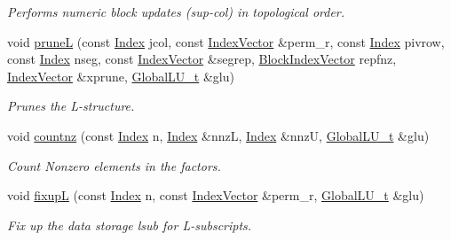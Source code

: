 \begin{DoxyCompactItemize}
\begin{DoxyCompactList}\small\item\em Performs numeric block updates (sup-\/col) in topological order. \end{DoxyCompactList}\item 
void \hyperlink{group___sparse_l_u___module_a350464d1c83182fbd7da8a5a74bdfde8}{pruneL} (const \hyperlink{namespace_eigen_a62e77e0933482dafde8fe197d9a2cfde}{Index} jcol, const \hyperlink{group___core___module}{Index\+Vector} \&perm\+\_\+r, const \hyperlink{namespace_eigen_a62e77e0933482dafde8fe197d9a2cfde}{Index} pivrow, const \hyperlink{namespace_eigen_a62e77e0933482dafde8fe197d9a2cfde}{Index} nseg, const \hyperlink{group___core___module}{Index\+Vector} \&segrep, \hyperlink{group___core___module_class_eigen_1_1_ref}{Block\+Index\+Vector} repfnz, \hyperlink{group___core___module}{Index\+Vector} \&xprune, \hyperlink{struct_eigen_1_1internal_1_1_l_u___global_l_u__t}{Global\+L\+U\+\_\+t} \&glu)
\begin{DoxyCompactList}\small\item\em Prunes the L-\/structure. \end{DoxyCompactList}\item 
\mbox{\label{group___sparse_l_u___module_acbede3f259186d48ad42ca093f80b64b}} 
void \hyperlink{group___sparse_l_u___module_acbede3f259186d48ad42ca093f80b64b}{countnz} (const \hyperlink{namespace_eigen_a62e77e0933482dafde8fe197d9a2cfde}{Index} n, \hyperlink{namespace_eigen_a62e77e0933482dafde8fe197d9a2cfde}{Index} \&nnzL, \hyperlink{namespace_eigen_a62e77e0933482dafde8fe197d9a2cfde}{Index} \&nnzU, \hyperlink{struct_eigen_1_1internal_1_1_l_u___global_l_u__t}{Global\+L\+U\+\_\+t} \&glu)
\begin{DoxyCompactList}\small\item\em Count Nonzero elements in the factors. \end{DoxyCompactList}\item 
void \hyperlink{group___sparse_l_u___module_ae1d1ed091956ff4e5734b4e3f79f866e}{fixupL} (const \hyperlink{namespace_eigen_a62e77e0933482dafde8fe197d9a2cfde}{Index} n, const \hyperlink{group___core___module}{Index\+Vector} \&perm\+\_\+r, \hyperlink{struct_eigen_1_1internal_1_1_l_u___global_l_u__t}{Global\+L\+U\+\_\+t} \&glu)
\begin{DoxyCompactList}\small\item\em Fix up the data storage lsub for L-\/subscripts. \end{DoxyCompactList}\item 

\end{DoxyCompactItemize}
